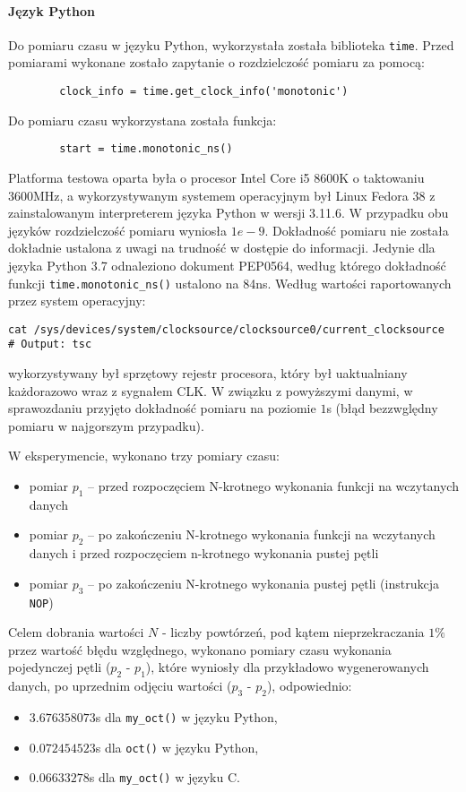 \documentclass[11pt]{article}
\begin{document}
		\paragraph{Język Python}
		Do pomiaru czasu w języku Python, wykorzystała została biblioteka \lstinline{time}.
		Przed pomiarami wykonane zostało zapytanie o rozdzielczość pomiaru za pomocą:
		\begin{lstlisting}
		clock_info = time.get_clock_info('monotonic')
		\end{lstlisting}
		Do pomiaru czasu wykorzystana została funkcja:
		\begin{lstlisting}
		start = time.monotonic_ns()
		\end{lstlisting}

		Platforma testowa oparta była o procesor Intel Core i5 8600K o taktowaniu 3600MHz, 
		a wykorzystywanym systemem operacyjnym był Linux Fedora 38 z zainstalowanym interpreterem języka Python w wersji 3.11.6. 
		W przypadku obu języków rozdzielczość pomiaru wyniosła $1e-9$.
		Dokładność pomiaru nie została dokładnie ustalona z uwagi na trudność w dostępie do informacji.
		Jedynie dla języka Python 3.7 odnaleziono dokument PEP0564, według którego dokładność funkcji \texttt{time.monotonic\_ns()} ustalono na 84ns.
		Według wartości raportowanych przez system operacyjny:
		\begin{lstlisting}
cat /sys/devices/system/clocksource/clocksource0/current_clocksource
# Output: tsc
		\end{lstlisting}
		wykorzystywany był sprzętowy rejestr procesora, który był uaktualniany każdorazowo wraz z sygnałem CLK.
		W związku z powyższymi danymi, w sprawozdaniu przyjęto dokładność pomiaru na poziomie $1$s (błąd bezzwględny pomiaru w najgorszym przypadku).
		
		W eksperymencie, wykonano trzy pomiary czasu:
		\begin{itemize}
			\item pomiar $p_1$ – przed rozpoczęciem N-krotnego wykonania funkcji na wczytanych danych
			\item pomiar $p_2$ – po zakończeniu N-krotnego wykonania funkcji na wczytanych danych i przed rozpoczęciem n-krotnego wykonania pustej pętli
			\item pomiar $p_3$ – po zakończeniu N-krotnego wykonania pustej pętli (instrukcja \texttt{NOP})
		\end{itemize}
		Celem dobrania wartości $N$ - liczby powtórzeń, pod kątem nieprzekraczania $1\%$ przez wartość błędu względnego, wykonano pomiary czasu wykonania pojedynczej pętli ($p_2$ - $p_1$), 
		które wyniosły dla przykładowo wygenerowanych danych, po uprzednim odjęciu wartości ($p_3$ - $p_2$), odpowiednio:
		\begin{itemize}
			\item $3.676358073$s dla \texttt{my\_oct()} w języku Python,
			\item $0.072454523$s dla \texttt{oct()} w języku Python,
			\item $0.06633278$s dla \texttt{my\_oct()} w języku C.
		\end{itemize}
\end{document}

